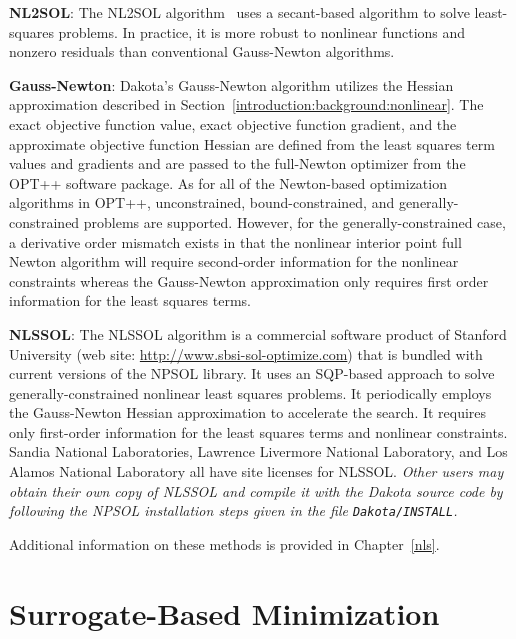 \textbf{NL2SOL}: The NL2SOL algorithm~\cite{Den81} uses a secant-based
algorithm to solve least-squares problems. In practice, it is more
robust to nonlinear functions and nonzero residuals than conventional
Gauss-Newton algorithms.

\textbf{Gauss-Newton}: Dakota's Gauss-Newton algorithm utilizes the
Hessian approximation described in
Section~\ref{introduction:background:nonlinear}. The exact objective
function value, exact objective function gradient, and the approximate
objective function Hessian are defined from the least squares term
values and gradients and are passed to the full-Newton optimizer from
the OPT++ software package. As for all of the Newton-based
optimization algorithms in OPT++, unconstrained, bound-constrained,
and generally-constrained problems are supported. However, for the
generally-constrained case, a derivative order mismatch exists in that
the nonlinear interior point full Newton algorithm will require
second-order information for the nonlinear constraints whereas the
Gauss-Newton approximation only requires first order information for
the least squares terms.

\textbf{NLSSOL}: The NLSSOL algorithm is a commercial software product
of Stanford University (web site: \url{http://www.sbsi-sol-optimize.com})
that is bundled with current versions of the NPSOL library. It uses an
SQP-based approach to solve generally-constrained nonlinear least
squares problems. It periodically employs the Gauss-Newton Hessian
approximation to accelerate the search. It requires only first-order
information for the least squares terms and nonlinear constraints.
Sandia National Laboratories, Lawrence Livermore National Laboratory,
and Los Alamos National Laboratory all have site licenses for NLSSOL.
\emph{Other users may obtain their own copy of NLSSOL and compile it with
the Dakota source code by following the NPSOL installation steps given
in the file {\tt Dakota/INSTALL}.}

Additional information on these methods is provided in Chapter~\ref{nls}.

\section{Surrogate-Based Minimization}\label{capabilities:sbm}

